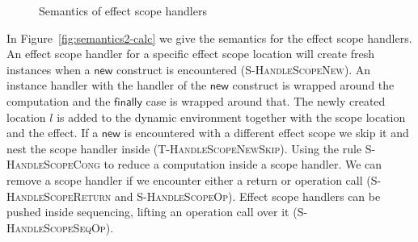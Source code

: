 {\begin{figure}[h]
\caption{Semantics of effect scope handlers}
\centering
{}
\end{figure}

In Figure~\ref{fig:semantics2-calc} we give the semantics for the effect scope handlers.
An effect scope handler for a specific effect scope location will create fresh instances when a $\mathsf{new}$ construct is encountered (\textsc{S-HandleScopeNew}).
An instance handler with the handler of the $\mathsf{new}$ construct is wrapped around the computation and the $\mathsf{finally}$ case is wrapped around that.
The newly created location $l$ is added to the dynamic environment together with the scope location and the effect.
If a $\mathsf{new}$ is encountered with a different effect scope we skip it and nest the scope handler inside (\textsc{T-HandleScopeNewSkip}).
Using the rule \textsc{S-HandleScopeCong} to reduce a computation inside a scope handler.
We can remove a scope handler if we encounter either a return or operation call (\textsc{S-HandleScopeReturn} and \textsc{S-HandleScopeOp}).
Effect scope handlers can be pushed inside sequencing, lifting an operation call over it (\textsc{S-HandleScopeSeqOp}).

}
